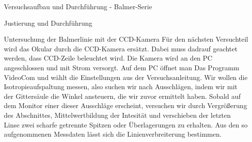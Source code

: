 \documentclass[pdftex, a4paper,11pt, twoside, ngerman]{report}
\begin{document}
\begin{chapter}{Versuchsaufbau und Durchführung - Balmer-Serie}
\begin{section}{Justierung und Durchführung}
\begin{subsection}{Untersuchung der Balmerlinie mit der CCD-Kamera}
        Für den nächsten Versuchteil wird das Okular durch die CCD-Kamera ersätzt. Dabei muss dadrauf geachtet werden, dass CCD-Zeile beleuchtet wird. Die Kamera wird an den PC angeschlossen und mit Strom versorgt. Auf dem PC öffnet man Das Programm VideoCom und wählt die Einstellungen aus der Versuchsanleitung. Wir wollen die Isotropieaufspaltung messen, also suchen wir nach Ausschlägen, indem wir mit der Gittersäule die Winkel ansteuern, die wir zuvor ermittelt haben. Sobald auf dem Monitor einer dieser Ausschläge erscheint, versuchen wir durch Vergrößerung des Abschnittes, Mittelwertbildung der Intesität und verschieben der letzten Linse zwei scharfe getrennte Spitzen oder Überlagerungen zu erhalten. Aus den so aufgenommenen Messdaten lässt sich die Linienverbreiterung bestimmen.


      \end{subsection}

    \end{section}

  \end{chapter}
 
\end{document}

